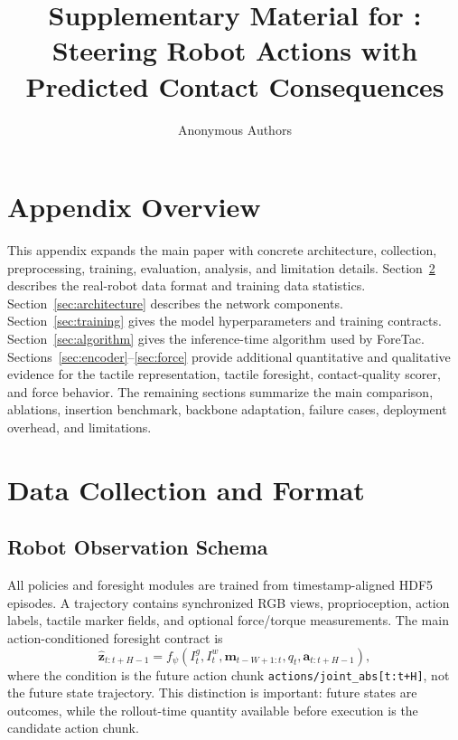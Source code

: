 \documentclass[10pt,letterpaper]{article}
\title{\LARGE \bf
Supplementary Material for \method{}: Steering Robot Actions with Predicted Contact Consequences}
\author{Anonymous Authors}
\date{}
\newcommand{\method}{ForeTac}
\newcommand{\marker}{\mathbf{m}}
\newcommand{\action}{\mathbf{a}}
\newcommand{\latent}{\mathbf{z}}
\begin{document}
\maketitle
\thispagestyle{empty}
\pagestyle{empty}
\raggedbottom

\section{Appendix Overview}

This appendix expands the main paper with concrete architecture, collection,
preprocessing, training, evaluation, analysis, and limitation details.
Section~\ref{sec:data} describes the real-robot data format and training data
statistics.
Section~\ref{sec:architecture} describes the network components.
Section~\ref{sec:training} gives the model hyperparameters and training
contracts. Section~\ref{sec:algorithm} gives the inference-time algorithm used
by \method{}. Sections~\ref{sec:encoder}--\ref{sec:force} provide additional
quantitative and qualitative evidence for the tactile representation, tactile
foresight, contact-quality scorer, and force behavior. The remaining sections
summarize the main comparison, ablations, insertion benchmark, backbone
adaptation, failure cases, deployment overhead, and limitations.

\section{Data Collection and Format}
\label{sec:data}

\subsection{Robot Observation Schema}

All policies and foresight modules are trained from timestamp-aligned HDF5
episodes. A trajectory contains synchronized RGB views, proprioception, action
labels, tactile marker fields, and optional force/torque measurements. The main
action-conditioned foresight contract is
\begin{equation}
\hat{\latent}_{t:t+H-1}
= f_\psi(I_t^g, I_t^w, \marker_{t-W+1:t}, q_t,
\action_{t:t+H-1}),
\end{equation}
where the condition is the future action chunk
\texttt{actions/joint\_abs[t:t+H]}, not the future state trajectory. This
distinction is important: future states are outcomes, while the rollout-time
quantity available before execution is the candidate action chunk.
\end{document}

